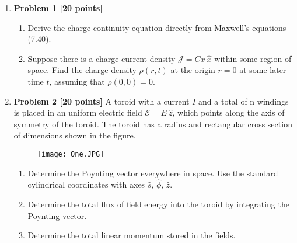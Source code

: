 \documentclass[fleqn]{article}
\begin{document}
  \begin{enumerate}
    \item \textbf{Problem 1 [20 points]}
    \begin{enumerate}
      \item Derive the charge continuity equation directly from Maxwell’s equations (7.40).

      
      \item Suppose there is a charge current density $\mathcal{J}=Cx ~ \hat{x}$ within some region of space. Find the
      charge density $\rho(r, t)$ at the origin $r=0$ at some later time $t$, assuming that $\rho(0, 0)=0$.

      
    \end{enumerate}


    \item \textbf{Problem 2 [20 points]} A toroid with a current $I$ and a total of n windings is placed in an uniform
    electric field $\mathcal{E}=E ~ \hat{z}$, which points along the axis of symmetry of the toroid. The toroid has a radius
    and rectangular cross section of dimensions shown in the figure.

      \begin{figure}[h!]
        \centering
        \texttt{[image: One.JPG]}
      \end{figure}

      \begin{enumerate}
        \item Determine the Poynting vector everywhere in space. Use the standard cylindrical coordinates
        with axes $\hat{s}$, $\hat{\phi}$, $\hat{z}$.


        \item Determine the total flux of field energy into the toroid by integrating the Poynting vector.


        \item Determine the total linear momentum stored in the fields.


\end{enumerate}
\end{enumerate}
\end{document}
